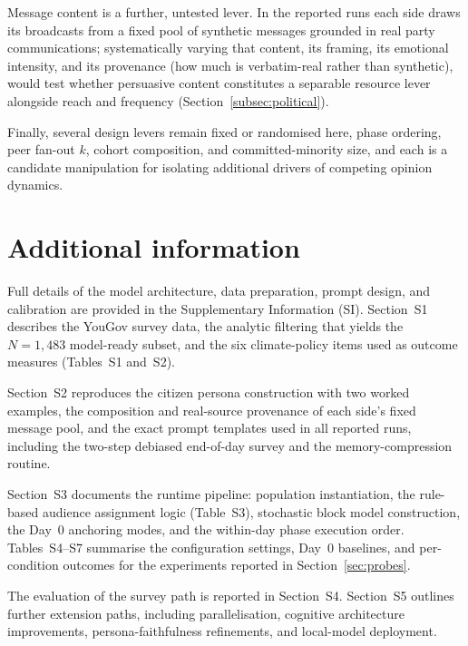 \documentclass[pdflatex,sn-mathphys-num]{sn-jnl}%
\theoremstyle{thmstyleone}%
\theoremstyle{thmstyletwo}%
\theoremstyle{thmstylethree}%
\begin{document}
Message content is a further, untested lever. In the reported runs each side draws its
broadcasts from a fixed pool of synthetic messages grounded in real party
communications; systematically varying that content, its framing, its emotional
intensity, and its provenance (how much is verbatim-real rather than synthetic), would
test whether persuasive
content constitutes a separable resource lever alongside reach and frequency
(Section~\ref{subsec:political}).

Finally, several design levers remain fixed or randomised here, phase ordering, peer
fan-out $k$, cohort composition, and committed-minority size, and each is a candidate
manipulation for isolating additional drivers of competing opinion dynamics.

\section*{Additional information}

Full details of the model architecture, data preparation, prompt design, and calibration
are provided in the Supplementary Information (SI). Section~S1 describes the YouGov
survey data, the analytic filtering that yields the $N=1{,}483$ model-ready subset, and
the six climate-policy items used as outcome measures (Tables~S1 and~S2).

Section~S2 reproduces the citizen persona construction with two worked examples, the
composition and real-source provenance of each side's fixed message pool, and the exact
prompt templates used in all reported runs, including the
two-step debiased end-of-day survey and the memory-compression routine.

Section~S3 documents the runtime pipeline: population instantiation, the rule-based
audience assignment logic (Table~S3), stochastic block model construction, the Day~0
anchoring modes, and the within-day phase execution order. Tables~S4--S7 summarise the
configuration settings, Day~0 baselines, and per-condition outcomes for the experiments
reported in Section~\ref{sec:probes}.

The evaluation of the survey path is reported in Section~S4. Section~S5 outlines further
extension paths, including parallelisation, cognitive architecture improvements,
persona-faithfulness refinements, and local-model deployment.

\end{document}
